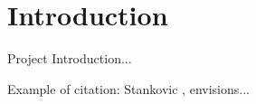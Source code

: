 \section{Introduction}

Project Introduction...

Example of citation: Stankovic \cite{Stankovic:2005}, envisions...



